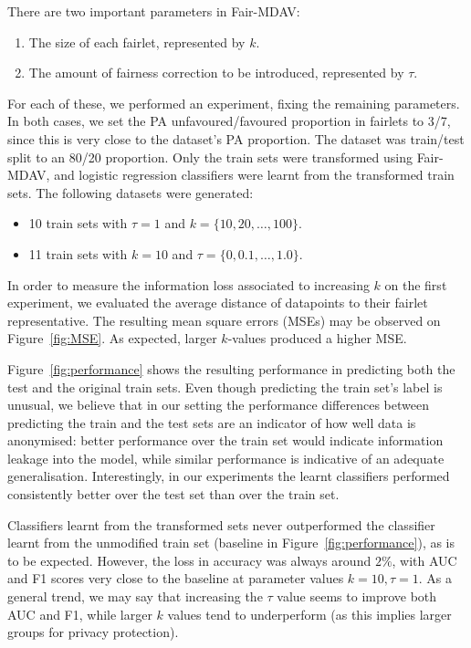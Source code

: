 There are two important parameters in Fair-MDAV:
\begin{enumerate}
  \item The size of each fairlet, represented by $k$.
  \item The amount of fairness correction to be introduced, represented by $\tau$.
\end{enumerate} 
For each of these, we performed an experiment, fixing the remaining parameters. In both cases, we set the PA unfavoured/favoured proportion in fairlets to 3/7, since this is very close to the dataset's PA proportion. The dataset was train/test split to an 80/20 proportion. Only the train sets were transformed using Fair-MDAV, and logistic regression classifiers were learnt from the transformed train sets. The following datasets were generated:
\begin{itemize}
  \item 10 train sets with $\tau = 1$ and $k = \{10, 20, \dots, 100\}$.
  \item 11 train sets with $k = 10$ and $\tau = \{0, 0.1, \dots, 1.0\}$.
\end{itemize}

In order to measure the information loss associated to increasing $k$ on the first experiment, we evaluated the average distance of datapoints to their fairlet representative. The resulting mean square errors (MSEs) may be observed on Figure~\ref{fig:MSE}. As expected, larger $k$-values produced a higher MSE.

Figure~\ref{fig:performance} shows the resulting performance in predicting both the test and the original train sets. Even though predicting the train set's label is unusual, we believe that in our setting the performance differences between predicting the train and the test sets are an indicator of how well data is anonymised: better performance over the train set would indicate information leakage into the model, while similar performance is indicative of an adequate generalisation. Interestingly, in our experiments the learnt classifiers performed consistently better over the test set than over the train set.

Classifiers learnt from the transformed sets never outperformed the classifier learnt from the unmodified train set (baseline in Figure~\ref{fig:performance}), as is to be expected. However, the loss in accuracy was always around $2\%$, with AUC and F1 scores very close to the baseline at parameter values $k = 10, \tau = 1$. As a general trend, we may say that increasing the $\tau$ value seems to improve both AUC and F1, while larger $k$ values tend to underperform (as this implies larger groups for privacy protection).

